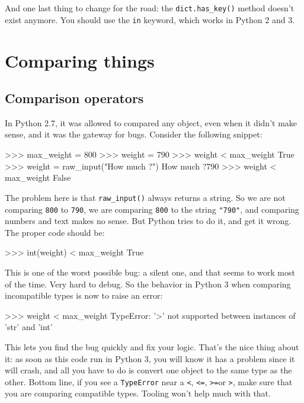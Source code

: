 And one last thing to change for the road: the \lstinline{dict.has_key()} method doesn't exist anymore. You should use the \lstinline{in} \gls{keyword}, which works in Python 2 and 3.

\section{Comparing things}

\subsection{Comparison operators}

In Python 2.7, it was allowed to compared any object, even when it didn't make sense, and it was the gateway for bugs. Consider the following snippet:

\begin{py2}
>>> max_weight = 800
>>> weight = 790
>>> weight < max_weight
True
>>> weight = raw_input("How much ?")
How much ?790
>>> weight < max_weight
False
\end{py2}

The problem here is that \lstinline{raw_input()} always returns a string. So we are not comparing \lstinline{800} to \lstinline{790}, we are comparing \lstinline{800} to the string \lstinline{"790"}, and comparing numbers and text makes no sense. But Python tries to do it, and get it wrong. The proper code should be:

\begin{py2}
>>> int(weight) < max_weight
True
\end{py2}

This is one of the worst possible bug: a silent one, and that seems to work most of the time. Very hard to debug. So the behavior in Python 3 when comparing incompatible types is now to raise an error:

\begin{py3}
>>> weight < max_weight
TypeError: '>' not supported between instances of 'str' and 'int'
\end{py3}

This lets you find the bug quickly and fix your logic. That's the nice thing about it: as soon as this code run in Python 3, you will know it has a problem since it will crash, and all you have to do is convert one object to the same type as the other. Bottom line, if you see a \lstinline{TypeError} near a \lstinline{<}, \lstinline{<=}, \lstinline{>=}or \lstinline{>}, make sure that you are comparing compatible types. Tooling won't help much with that.

